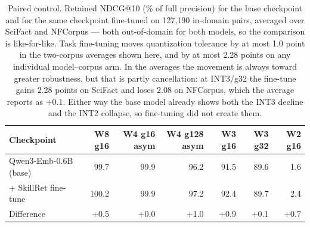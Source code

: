 \begin{table}[t]\centering\small
\caption{Paired control. Retained NDCG@10 (\% of full precision) for the base checkpoint and
for the same checkpoint fine-tuned on 127{,}190 in-domain pairs, averaged over SciFact and
NFCorpus --- both out-of-domain for both models, so the comparison is like-for-like. Task
fine-tuning moves quantization tolerance by at most 1.0 point in the two-corpus averages
shown here, and by at most 2.28 points on any individual model--corpus arm. In the averages
the movement is always toward greater robustness, but that is partly cancellation: at
INT3/g32 the fine-tune gains 2.28 points on SciFact and loses 2.08 on NFCorpus, which the
average reports as $+0.1$. Either way the base model already shows both the INT3 decline and
the INT2 collapse, so fine-tuning did not create them.}
\label{tab:paired}
\begin{tabular}{lrrrrrr}
\toprule
Checkpoint & W8 g16 & W4 g16 asym & W4 g128 asym & W3 g16 & W3 g32 & W2 g16 \\
\midrule
Qwen3-Emb-0.6B (base) & 99.7 & 99.9 & 96.2 & 91.5 & 89.6 & 1.6 \\
\quad + SkillRet fine-tune & 100.2 & 99.9 & 97.2 & 92.4 & 89.7 & 2.4 \\
\midrule
Difference & +0.5 & +0.0 & +1.0 & +0.9 & +0.1 & +0.7 \\
\bottomrule
\end{tabular}\end{table}